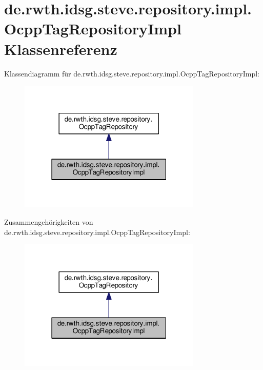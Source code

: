 \hypertarget{classde_1_1rwth_1_1idsg_1_1steve_1_1repository_1_1impl_1_1_ocpp_tag_repository_impl}{\section{de.\+rwth.\+idsg.\+steve.\+repository.\+impl.\+Ocpp\+Tag\+Repository\+Impl Klassenreferenz}
\label{classde_1_1rwth_1_1idsg_1_1steve_1_1repository_1_1impl_1_1_ocpp_tag_repository_impl}
}


Klassendiagramm für de.\+rwth.\+idsg.\+steve.\+repository.\+impl.\+Ocpp\+Tag\+Repository\+Impl\+:\nopagebreak
\begin{figure}[H]
\begin{center}
\leavevmode
\includegraphics[width=247pt]{classde_1_1rwth_1_1idsg_1_1steve_1_1repository_1_1impl_1_1_ocpp_tag_repository_impl__inherit__graph}
\end{center}
\end{figure}


Zusammengehörigkeiten von de.\+rwth.\+idsg.\+steve.\+repository.\+impl.\+Ocpp\+Tag\+Repository\+Impl\+:\nopagebreak
\begin{figure}[H]
\begin{center}
\leavevmode
\includegraphics[width=247pt]{classde_1_1rwth_1_1idsg_1_1steve_1_1repository_1_1impl_1_1_ocpp_tag_repository_impl__coll__graph}
\end{center}
\end{figure}
